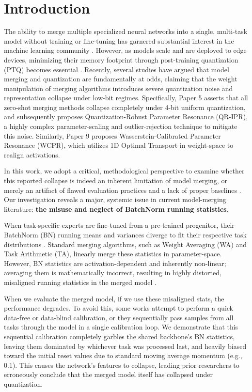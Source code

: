 \documentclass{article}
\theoremstyle{plain}
\theoremstyle{definition}
\theoremstyle{remark}
\begin{document}
\section{Introduction}
\label{sec:intro}

The ability to merge multiple specialized neural networks into a single, multi-task model without training or fine-tuning has garnered substantial interest in the machine learning community \cite{ilharco2022editing, yadav2023ties, wortsman2022robust}. However, as models scale and are deployed to edge devices, minimizing their memory footprint through post-training quantization (PTQ) becomes essential \cite{gholami2021survey}. Recently, several studies have argued that model merging and quantization are fundamentally at odds, claiming that the weight manipulation of merging algorithms introduces severe quantization noise and representation collapse under low-bit regimes. Specifically, Paper 5 \cite{paper5} asserts that all zero-shot merging methods collapse completely under 4-bit uniform quantization, and subsequently proposes Quantization-Robust Parameter Resonance (QR-IPR), a highly complex parameter-scaling and outlier-rejection technique to mitigate this noise. Similarly, Paper 9 \cite{paper9} proposes Wasserstein-Calibrated Parameter Resonance (WCPR), which utilizes 1D Optimal Transport in weight-space to realign activations.

In this work, we adopt a critical, methodological perspective to examine whether this reported collapse is indeed an inherent limitation of model merging, or merely an artifact of flawed evaluation practices and a lack of proper baselines \cite{sculley2018winner, bouthillier2021accounting}. Our investigation reveals a major, systemic issue in current model-merging literature: \textbf{the misuse and neglect of BatchNorm running statistics}.

When task-specific experts are fine-tuned from a pre-trained progenitor, their BatchNorm (BN) running means and variances diverge to fit their respective task distributions \cite{ioffe2015batch, li2016adaptive}. Standard merging algorithms, such as Weight Averaging (WA) and Task Arithmetic (TA), linearly merge these statistics in parameter-space. However, BN statistics are activation-dependent and inherently non-linear; averaging them is mathematically incorrect, resulting in highly distorted, misaligned running statistics in the merged model \cite{jordan2023calibrating}. 

When we evaluate the merged model, if we use these misaligned stats, the performance degrades. To avoid this, some works attempt to perform a quick data-free or data-blind calibration, or they sequentially pass samples from all tasks through the model in a single calibration loop. We demonstrate that this sequential calibration completely garbles the shared backbone's BN statistics, leaving them dominated by whichever task was processed last, and heavily biased toward the initial reset values due to standard moving average momentum (e.g., $0.1$). This causes the network's features to collapse, leading prior researchers to erroneously conclude that the merged model itself has collapsed under quantization.
\end{document}
